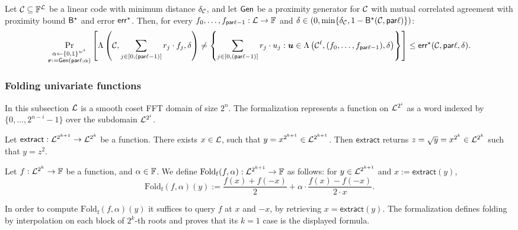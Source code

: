 \begin{lemma}\label{lemma: mutual_corrAgr_listdecoding}
    Let $\mathcal{C} \subseteq \mathbb{F}^{\mathcal{L}}$ be a linear code with minimum distance $\delta_{\mathcal{C}}$, and let $\mathsf{Gen}$ be a proximity generator for $\mathcal{C}$ with mutual correlated agreement with proximity bound ${\mathsf{B}}^\star$ and error $\mathsf{err}^\star$. Then, for every $f_0, \ldots, f_{\mathsf{par}\ell-1} : \mathcal{L} \to \mathbb{F}$ and $\delta \in (0, \min\{\delta_{\mathcal{C}}, 1 - {\mathsf{B}}^\star(\mathcal{C}, \mathsf{par}\ell)\})$:
    \[
    \Pr_{\substack{\alpha \leftarrow \{0,1\}^{w^\star} \\ \boldsymbol{r} := \mathsf{Gen}(\mathsf{par}\ell; \alpha)}} \left[
    \Lambda\left(\mathcal{C}, \sum_{j \in [0,(\mathsf{par}\ell-1)]} r_j \cdot f_j, \delta \right) \neq
    \left\{ \sum_{j \in [0,(\mathsf{par}\ell-1)]} r_j \cdot u_j : \boldsymbol{u} \in \Lambda\left(\mathcal{C}^\ell, (f_0, \ldots, f_{\mathsf{par}\ell-1}), \delta \right) \right\}
    \right] \leq \mathsf{err}^\star(\mathcal{C}, \mathsf{par}\ell, \delta).
    \]
\end{lemma}

\subsubsection{Folding univariate functions}

In this subsection $\mathcal{L}$ is a smooth coset FFT domain of size $2^n$. The formalization
represents a function on $\mathcal{L}^{2^i}$ as a word indexed by $\{0,\ldots,2^{n-i}-1\}$ over
the subdomain $\mathcal{L}^{2^i}$.

\begin{definition}\label{def:extract}
\leanok
    Let $\mathsf{extract}:\mathcal{L}^{2^{k+1}}\rightarrow \mathcal{L}^{2^k}$ be a function. There exists $x \in \mathcal{L}$, such that $y = x^{2^{k+1}}\in\mathcal{L}^{2^{k+1}}$. Then $\mathsf{extract}$ returns $z = \sqrt{y} = x^{2^k}\in\mathcal{L}^{2^k}$ such that $y = z^2$.
\end{definition}

\begin{definition}\label{def:foldf}
\leanok
{}
    Let $f : \mathcal{L}^{2^k} \to \mathbb{F}$ be a function, and $\alpha \in \mathbb{F}$. We define $\mathrm{Fold_f}(f, {\alpha}) : \mathcal{L}^{2^{k+1}} \to \mathbb{F}$ as follows: for $y \in \mathcal{L}^{2^{k+1}}$ and $x := \mathsf{extract}(y)$,
    \[
    \mathrm{Fold_f}(f, \alpha)(y) := \frac{f(x) + f(-x)}{2} + \alpha \cdot \frac{f(x) - f(-x)}{2 \cdot x}.
    \]

    In order to compute $\mathrm{Fold_f}(f, \alpha)(y)$ it suffices to query $f$ at $x$ and $-x$, by retrieving $x=\mathsf{extract}(y)$.
    The formalization defines folding by interpolation on each block of $2^k$-th roots and proves
    that its $k=1$ case is the displayed formula.
\end{definition}

